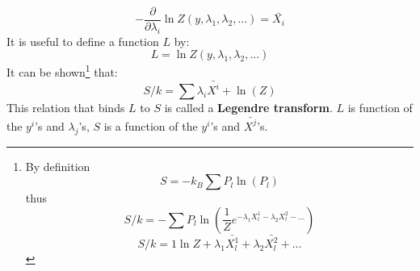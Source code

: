 \documentclass[12pt]{book}
\begin{document}
\begin{equation}
-\frac{\partial}{\partial \lambda_i}\ln Z(y,\lambda_1,\lambda_2,...) =
\bar{X_i} 
\end{equation}
It is useful to define a function $L$ by:
\begin{equation}
L=\ln Z(y,\lambda_1,\lambda_2,...)
\end{equation}
It can be shown\footnote{%
By definition
\begin{equation}
S=-k_B\sum P_l \ln (P_l)
\end{equation}
thus
\begin{equation}
S/k=-\sum P_l\ln(\frac{1}{Z}e^{-\lambda_1 X^{1}_l-\lambda_2 X^{2}_l- ...})
\end{equation}
\begin{equation}
S/k=1\ln Z+\lambda_1 \bar{X^{1}_l}+\lambda_2 \bar{X^{2}_l}+ ...
\end{equation}
} that:
\begin{equation}
S/k=\sum \lambda_i \bar{X^i}+\ln(Z)
\end{equation}
This relation that binds $L$ to $S$ is called a {\bf Legendre
  transform}. 
$L$ is function of the $y^i$'s and  $\lambda_j$'s, $S$ is a function of
the $ y^i$'s and $\bar{X^j}$'s.
\end{document}
